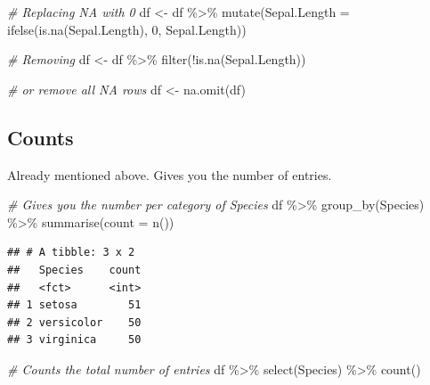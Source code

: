 \documentclass[
]{book}
\newenvironment{Shaded}{\begin{snugshade}}{\end{snugshade}}
\newcommand{\AttributeTok}[1]{\textcolor[rgb]{0.77,0.63,0.00}{#1}}
\newcommand{\CommentTok}[1]{\textcolor[rgb]{0.56,0.35,0.01}{\textit{#1}}}
\newcommand{\DecValTok}[1]{\textcolor[rgb]{0.00,0.00,0.81}{#1}}
\newcommand{\FunctionTok}[1]{\textcolor[rgb]{0.00,0.00,0.00}{#1}}
\newcommand{\NormalTok}[1]{#1}
\newcommand{\OtherTok}[1]{\textcolor[rgb]{0.56,0.35,0.01}{#1}}
\newcommand{\SpecialCharTok}[1]{\textcolor[rgb]{0.00,0.00,0.00}{#1}}
\begin{document}
\begin{Shaded}
\begin{Highlighting}[]
\CommentTok{\# Replacing NA with 0}
\NormalTok{df }\OtherTok{\textless{}{-}}\NormalTok{ df }\SpecialCharTok{\%\textgreater{}\%} 
  \FunctionTok{mutate}\NormalTok{(}\AttributeTok{Sepal.Length =} \FunctionTok{ifelse}\NormalTok{(}\FunctionTok{is.na}\NormalTok{(Sepal.Length), }\DecValTok{0}\NormalTok{, Sepal.Length))}

\CommentTok{\# Removing}
\NormalTok{df }\OtherTok{\textless{}{-}}\NormalTok{ df }\SpecialCharTok{\%\textgreater{}\%} 
  \FunctionTok{filter}\NormalTok{(}\SpecialCharTok{!}\FunctionTok{is.na}\NormalTok{(Sepal.Length))}

\CommentTok{\# or remove all NA rows}
\NormalTok{df }\OtherTok{\textless{}{-}} \FunctionTok{na.omit}\NormalTok{(df)}
\end{Highlighting}
\end{Shaded}

\hypertarget{counts}{%
\subsection{Counts}\label{counts}}

Already mentioned above.
Gives you the number of entries.

\begin{Shaded}
\begin{Highlighting}[]
\CommentTok{\# Gives you the number per category of Species}
\NormalTok{df }\SpecialCharTok{\%\textgreater{}\%} 
  \FunctionTok{group\_by}\NormalTok{(Species) }\SpecialCharTok{\%\textgreater{}\%} 
  \FunctionTok{summarise}\NormalTok{(}\AttributeTok{count =} \FunctionTok{n}\NormalTok{())}
\end{Highlighting}
\end{Shaded}

\begin{verbatim}
## # A tibble: 3 x 2
##   Species    count
##   <fct>      <int>
## 1 setosa        51
## 2 versicolor    50
## 3 virginica     50
\end{verbatim}

\begin{Shaded}
\begin{Highlighting}[]
\CommentTok{\# Counts the total number of entries}
\NormalTok{df }\SpecialCharTok{\%\textgreater{}\%} 
  \FunctionTok{select}\NormalTok{(Species) }\SpecialCharTok{\%\textgreater{}\%} 
  \FunctionTok{count}\NormalTok{()}
\end{Highlighting}
\end{Shaded}
\end{document}
